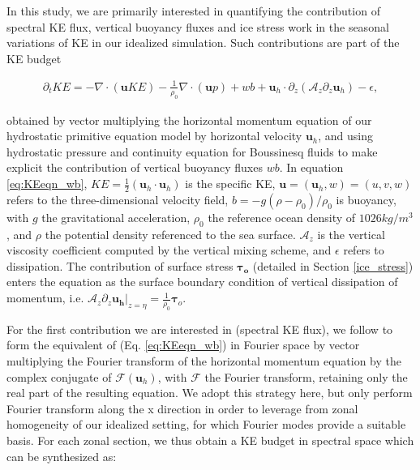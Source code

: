 \documentclass[draft]{agujournal2019}
\begin{document}
In this study, we are primarily interested in quantifying the contribution of spectral KE flux, vertical buoyancy fluxes and ice stress work in the seasonal variations of KE in our idealized simulation. Such contributions are part of the KE budget
\begin{linenomath*}
  \begin{align}
          \partial_t KE = - \nabla \cdot \left( \mathbf{u} KE \right)
          - \frac{1}{\rho_0}\nabla \cdot \left( \mathbf{u} p \right) + wb
          + \mathbf{u}_h \cdot \partial_z \left( \mathcal{A}_z \partial_z \mathbf{u}_h \right)
          - \epsilon,
  \label{eq:KEeqn_wb}
  \end{align}
\end{linenomath*}
obtained by vector multiplying the horizontal momentum equation of our hydrostatic primitive equation model by horizontal velocity $\mathbf{u}_h$, and using hydrostatic pressure and continuity equation for Boussinesq fluids to make explicit the contribution of vertical buoyancy fluxes $wb$. In equation  \ref{eq:KEeqn_wb}, 
$KE=\frac{1}{2}(\mathbf{u}_h \cdot \mathbf{u}_h)$ is the specific KE,
$\mathbf{u}=(\mathbf{u}_h,w)=(u,v,w)$ refers to the three-dimensional velocity field, $b=-g(\rho-\rho_0)/\rho_0$ is buoyancy, with $g$ the gravitational acceleration, $\rho_0$ the reference ocean density of $1026 kg/m^{3}$, and $\rho$ the potential density referenced to the sea surface.
$\mathcal{A}_z$ is the vertical viscosity coefficient computed by the vertical mixing scheme, and $\epsilon$ refers to dissipation.
The contribution of surface stress $\mathbf{\tau_o}$ (detailed in Section \ref{ice_stress}) enters the equation as the surface boundary condition of vertical dissipation of momentum, i.e. $\mathcal{A}_z\partial_z \mathbf{u_h}|_{z=\eta}=\frac{1}{\rho_0}\mathbf{\tau}_o$. 


For the first contribution we are interested in (spectral KE flux), we follow \citet{Capet_Mesoscale_2008} to form the equivalent of (Eq. \ref{eq:KEeqn_wb}) in Fourier space by vector multiplying the Fourier transform of the horizontal momentum equation by the complex conjugate of $\mathcal{F}(\mathbf{u}_h)$, with $\mathcal{F}$ the Fourier transform, retaining only the real part of the resulting equation. We adopt this strategy here, but only perform Fourier transform along the x direction in order to leverage from zonal homogeneity of our idealized setting, for which Fourier modes provide a suitable basis. 
For each zonal section, we thus obtain a KE budget in spectral space which can be synthesized as:
\end{document}
